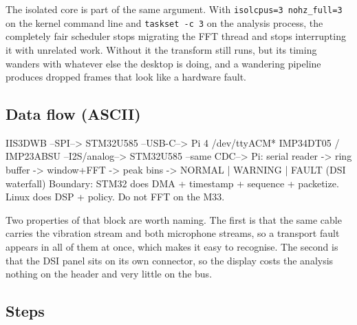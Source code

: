 The isolated core is part of the same argument. With \texttt{isolcpus=3 nohz\_full=3} on the kernel command line and \texttt{taskset -c 3} on the analysis process, the completely fair scheduler stops migrating the FFT thread and stops interrupting it with unrelated work. Without it the transform still runs, but its timing wanders with whatever else the desktop is doing, and a wandering pipeline produces dropped frames that look like a hardware fault.

\subsection*{Data flow (ASCII)}

\begin{asciiart}
IIS3DWB --SPI--> STM32U585 --USB-C--> Pi 4 /dev/ttyACM*
IMP34DT05 / IMP23ABSU --I2S/analog--> STM32U585 --same CDC-->
Pi: serial reader -> ring buffer -> window+FFT -> peak bins
     -> NORMAL | WARNING | FAULT  (DSI waterfall)
Boundary: STM32 does DMA + timestamp + sequence + packetize.
          Linux does DSP + policy. Do not FFT on the M33.
\end{asciiart}

Two properties of that block are worth naming. The first is that the same cable carries the vibration stream and both microphone streams, so a transport fault appears in all of them at once, which makes it easy to recognise. The second is that the DSI panel sits on its own connector, so the display costs the analysis nothing on the header and very little on the bus.

\subsection*{Steps}

